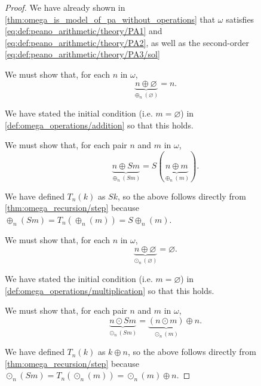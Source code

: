 \begin{proof}
  We have already shown in \cref{thm:omega_is_model_of_pa_without_operations} that \( \omega \) satisfies \eqref{eq:def:peano_arithmetic/theory/PA1} and \eqref{eq:def:peano_arithmetic/theory/PA2}, as well as the second-order \eqref{eq:def:peano_arithmetic/theory/PA3/sol}

   We must show that, for each \( n \) in \( \omega \),
  \begin{equation*}
    \underbrace{n \oplus \varnothing}_{\oplus_n(\varnothing)} = n.
  \end{equation*}

  We have stated the initial condition (i.e. \( m = \varnothing \)) in \cref{def:omega_operations/addition} so that this holds.

   We must show that, for each pair \( n \) and \( m \) in \( \omega \),
  \begin{equation*}
    \underbrace{n \oplus Sm}_{\oplus_n(Sm)} = S(\underbrace{n \oplus m}_{\oplus_n(m)}).
  \end{equation*}

  We have defined \( T_n(k) \) as \( Sk \), so the above follows directly from \cref{thm:omega_recursion/step} because \( \oplus_n(Sm) = T_n(\oplus_n(m)) = S {\oplus_n(m)} \).

   We must show that, for each \( n \) in \( \omega \),
  \begin{equation*}
    \underbrace{n \oplus \varnothing}_{\odot_n(\varnothing)} = \varnothing.
  \end{equation*}

  We have stated the initial condition (i.e. \( m = \varnothing \)) in \cref{def:omega_operations/multiplication} so that this holds.

   We must show that, for each pair \( n \) and \( m \) in \( \omega \),
  \begin{equation*}
    \underbrace{n \odot Sm}_{\odot_n(Sm)} = \underbrace{(n \odot m)}_{\odot_n(m)} \oplus n.
  \end{equation*}

  We have defined \( T_n(k) \) as \( k \oplus n \), so the above follows directly from \cref{thm:omega_recursion/step} because \( \odot_n(Sm) = T_n(\odot_n(m)) = \odot_n(m) \oplus n \).
\end{proof}


